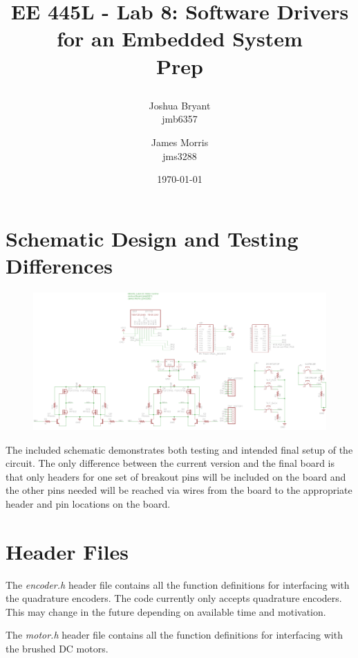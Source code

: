 \documentclass{article}
\title{
	\begin{LARGE}
	\textbf{EE 445L - Lab 8: Software Drivers for an Embedded System\\Prep}
	\end{LARGE}
}
\author{Joshua Bryant \\ jmb6357 \and James Morris \\ jms3288}
\date{\today}
\begin{document}
\maketitle

\section{Schematic Design and Testing Differences}

	\begin{figure}[h]
		\includegraphics[keepaspectratio, width = \textwidth]{Lab8PrepGraphics/Ropebot_SchematicV2.png}
	\end{figure}
	
	The included schematic demonstrates both testing and intended final setup of the circuit. The only difference between the current version and the final board is that only headers for one set of breakout pins will be included on the board and the other pins needed will be reached via wires from the board to the appropriate header and pin locations on the board.\newpage

\section{Header Files}

The \textit{encoder.h} header file contains all the function definitions for interfacing with the quadrature encoders. The code currently only accepts quadrature encoders. This may change in the future depending on available time and motivation.


\par The \textit{motor.h} header file contains all the function definitions for interfacing with the brushed DC motors.

\end{document}
